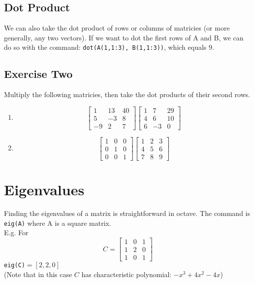 \documentclass{article}
\begin{document}
\subsection{Dot Product}
We can also take the dot product of rows or columns of matricies (or more generally, any two vectors). If we want to dot the first rows of A and B, we can do so with the command: \verb|dot(A(1,1:3), B(1,1:3))|, which equals $9$.

\subsection{Exercise Two}
Multiply the following matricies, then take the dot products of their second rows.
\begin{enumerate}
\item
  \[
  \left[
  \begin{array}{ccc}
    1 & 13 & 40\\
    5 & -3 & 8 \\
    -9 & 2 & 7
  \end{array}
  \right]
  \left[
  \begin{array}{ccc}
    1 & 7 & 29\\
    4 & 6 & 10 \\
    6 & -3 & 0
  \end{array}
  \right]
  \]
\item
  \[
  \left[
  \begin{array}{ccc}
    1 & 0 & 0\\
    0 & 1 & 0 \\
    0 & 0 & 1
  \end{array}
  \right]
  \left[
  \begin{array}{ccc}
    1 & 2 & 3\\
    4 & 5 & 6 \\
    7 & 8 & 9
  \end{array}
  \right]
  \]
\end{enumerate}
\section{Eigenvalues}
Finding the eigenvalues of a matrix is straightforward in octave.  The command is \verb|eig(A)| where A is a square matrix.
\\E.g. For
\[C=
\left[
\begin{array}{ccc}
1 & 0 & 1\\
1 & 2 & 0 \\
1 & 0 & 1
 \end{array}
 \right]
\]
\verb|eig(C)|$= [2,2,0]$
\\(Note that in this case $C$ has characteristic polynomial: $-x^3+4x^2-4x$)
\end{document}
